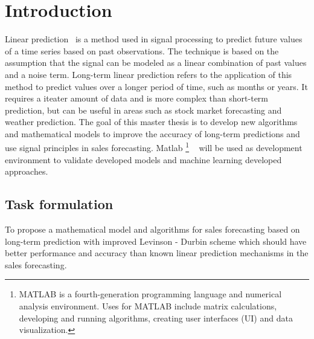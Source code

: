 
{}

\chapter*{Introduction}

Linear prediction~\cite{Vaidyanathan} is a method used in signal processing to predict
future values of a time series based on past observations. The technique is based on
the assumption that the signal can be modeled as a linear combination of past values
and a noise term. Long-term linear prediction refers to the application of this
method to predict values over a longer period of time, such as months or years.
It requires a iteater amount of data and is more complex than short-term prediction,
but can be useful in areas such as stock market forecasting and weather prediction.
The goal of this master thesis is to develop new algorithms and mathematical models
to improve the accuracy of long-term predictions and use signal principles in sales
forecasting. Matlab \footnote{MATLAB is a fourth-generation programming language and
numerical analysis environment. Uses for MATLAB include matrix calculations, developing
and running algorithms, creating user interfaces (UI) and data visualization.}
~\cite{livescript} will be used as development environment to validate
developed models and machine learning developed approaches.

\section*{Task formulation}

To propose a mathematical model and algorithms for sales forecasting based on long-term
prediction with improved Levinson - Durbin scheme which should have better performance
and accuracy than known linear prediction mechanisms in the sales forecasting.
